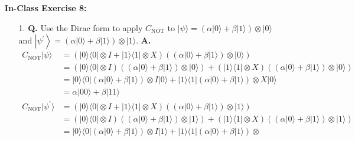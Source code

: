 \documentclass[main.tex]{subfiles}
\begin{document}
\begin{enumerate}
\item[] \textbf{In-Class Exercise 8:}
    \begin{enumerate}
        \item[1.] \textbf{Q.} Use the Dirac form to apply $C_{\text{NOT}}$ to $|\psi\rangle=(\alpha|0\rangle+\beta|1\rangle) \otimes |0\rangle$ and $\left|\psi^{\prime}\right\rangle=(\alpha|0\rangle+\beta|1\rangle) \otimes |1\rangle$. \textbf{A.} 
        \begin{align*}
            C_{\text{NOT}}|\psi\rangle          & = (|0\rangle\langle 0|\otimes I+ |1\rangle\langle 1| \otimes X)
                                                ((\alpha|0\rangle+\beta|1\rangle)\otimes |0\rangle)\\
                                                & = (|0\rangle\langle0|\otimes I)
                                                ((\alpha|0\rangle+\beta|1\rangle)\otimes |0\rangle)
                                                + (|1\rangle\langle 1| \otimes X)
                                                ((\alpha|0\rangle+\beta|1\rangle)\otimes |0\rangle)\\
                                                & = |0\rangle\langle 0|(\alpha|0\rangle+\beta|1\rangle) \otimes
                                                I|0\rangle + 
                                                |1\rangle\langle 1|(\alpha|0\rangle+\beta|1\rangle) \otimes
                                                X|0\rangle\\
                                                & = \alpha|00\rangle + \beta|11\rangle\\
            C_{\text{NOT}}|\psi^{\prime}\rangle & = (|0\rangle\langle 0|\otimes I + |1\rangle\langle 1| \otimes X)
                                                ((\alpha|0\rangle+\beta|1\rangle) \otimes |1\rangle)\\
                                                & = (|0\rangle\langle 0|\otimes I)
                                                ((\alpha|0\rangle+\beta|1\rangle) \otimes |1\rangle)
                                                + (|1\rangle\langle 1| \otimes X)
                                                ((\alpha|0\rangle+\beta|1\rangle) \otimes |1\rangle)\\
                                                & = |0\rangle\langle 0|(\alpha|0\rangle+\beta|1\rangle) \otimes
                                                I|1\rangle +
                                                |1\rangle\langle 1|(\alpha|0\rangle+\beta|1\rangle) \otimes

\end{align*}
\end{enumerate}
\end{enumerate}
\end{document}
